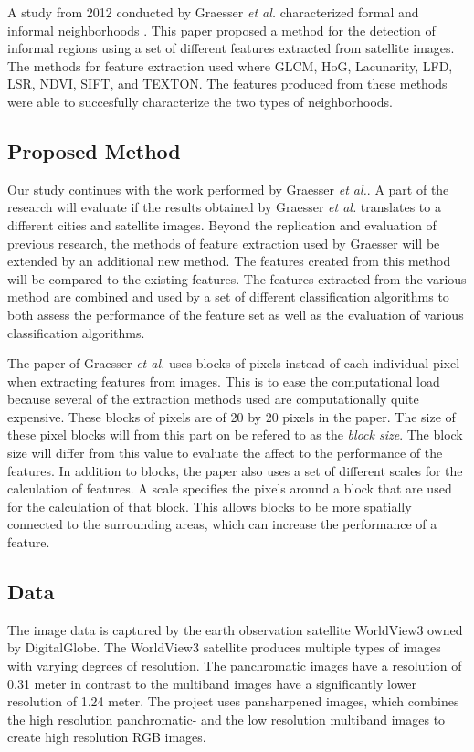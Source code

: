 A study from 2012 conducted by Graesser \textit{et al.} characterized formal
and informal neighborhoods \cite{graesser2012image}. This paper proposed
a method for the detection of informal regions using a set of different
features extracted from satellite images. The methods for feature extraction
used where GLCM, HoG, Lacunarity, LFD, LSR, NDVI, SIFT, and TEXTON. The
features produced from these methods were able to succesfully characterize the
two types of neighborhoods.

\subsection{Proposed Method}

Our study continues with the work performed by Graesser \textit{et al.}.
A part of the research will evaluate if the results obtained by Graesser
\textit{et al.} translates to a different cities and satellite images. Beyond
the replication and evaluation of previous research, the methods of feature
extraction used by Graesser will be extended by an additional new method. The
features created from this method will be compared to the existing features.
The features extracted from the various method are combined and used by a set
of different classification algorithms to both assess the performance of the
feature set as well as the evaluation of various classification algorithms.

The paper of Graesser \textit{et al.} uses blocks of pixels instead of each
individual pixel when extracting features from images.  This is to ease the
computational load because several of the extraction methods used are
computationally quite expensive. These blocks of pixels are of 20 by
20 pixels in the paper. The size of these pixel blocks will from this part on
be refered to as the \textit{block size}. The block size will differ from
this value to evaluate the affect to the performance of the features.
In addition to blocks, the paper also uses a set of different scales for the
calculation of features. A scale specifies the pixels around a block that
are used for the calculation of that block. This allows blocks to be more
spatially connected to the surrounding areas, which can increase the
performance of a feature.

\subsection{Data}

The image data is captured by the earth observation satellite WorldView3 owned
by DigitalGlobe. The WorldView3 satellite produces multiple types of images
with varying degrees of resolution. The panchromatic images have a resolution
of 0.31 meter in contrast to  the multiband images have a significantly lower
resolution of 1.24 meter. The project uses pansharpened images, which combines
the high resolution panchromatic- and the low resolution multiband images to
create high resolution RGB images.

